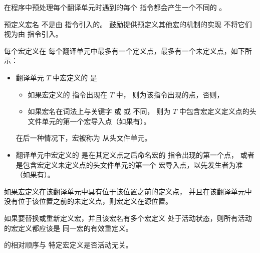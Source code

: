     \pnum
    在程序中预处理每个翻译单元时遇到的每个  指令都会产生一个不同的
    。
    \begin{note}
    预定义宏名
    不是由  指令引入的。
    鼓励提供预定义其他宏的机制的实现
    不将它们视为由  指令引入。
    \end{note}
    每个宏定义在
    每个翻译单元中最多有一个定义点，最多有一个未定义点，如下所示：
    \begin{itemize}
    \item
    翻译单元 $T$ 中宏定义的  是
    \begin{itemize}
    \item
    如果宏定义的  指令出现在 $T$ 中，
    则为该指令出现的点，否则，
    \item
    如果宏名在词法上与关键字
    或   或  不同，
    则为 $T$ 中包含宏定义定义点的头文件单元的第一个宏导入点（如果有）。
    \end{itemize}
    在后一种情况下，宏被称为
    从头文件单元。
    
    \item
    翻译单元中宏定义的 
    是在其定义点之后命名宏的  指令出现的第一个点，
    或者是包含宏定义未定义点的头文件单元的第一个
    宏导入点，以先发生者为准（如果有）。
    \end{itemize}
    
    \pnum
    如果宏定义在该翻译单元中具有位于该位置之前的定义点，
    并且在该翻译单元中没有位于该位置之前的未定义点，则宏定义在源位置。
    
    \pnum
    如果要替换或重新定义宏，并且该宏名有多个宏定义
    处于活动状态，则所有活动的宏定义都应该是
    同一宏的有效重定义。
    \begin{note}
     的相对顺序与
    特定宏定义是否活动无关。
    \end{note}
    
